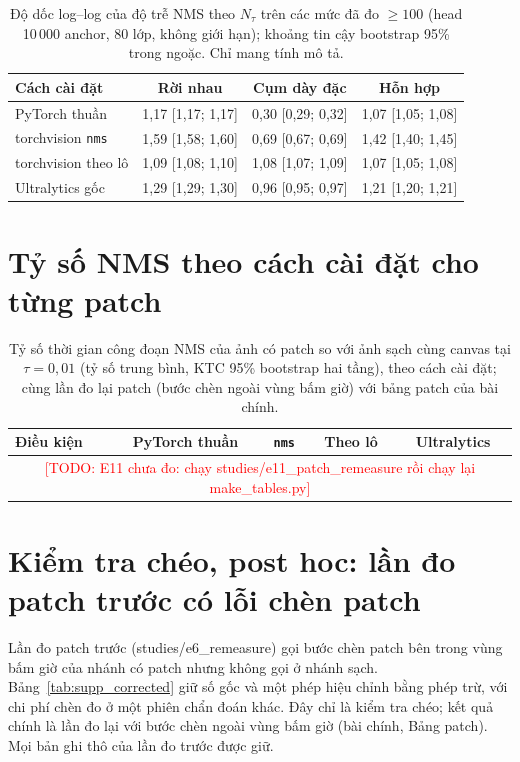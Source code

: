 \documentclass[11pt,a4paper]{article}
\newcommand{\Ntau}{N_{\tau}}
\newcommand{\todo}[1]{\textcolor{red}{[TODO: #1]}}
\begin{document}
\begin{table}[t]
\centering\small
\caption{Độ dốc log--log của độ trễ NMS theo $\Ntau$ trên các mức đã đo $\ge 100$ (head 10\,000 anchor, 80 lớp, không giới hạn); khoảng tin cậy bootstrap 95\% trong ngoặc. Chỉ mang tính mô tả.}
\label{tab:slopes}
\begin{tabular}{@{}lccc@{}}
\toprule
Cách cài đặt & Rời nhau & Cụm dày đặc & Hỗn hợp \\
\midrule
PyTorch thuần & 1,17 [1,17; 1,17] & 0,30 [0,29; 0,32] & 1,07 [1,05; 1,08] \\
torchvision \texttt{nms} & 1,59 [1,58; 1,60] & 0,69 [0,67; 0,69] & 1,42 [1,40; 1,45] \\
torchvision theo lô & 1,09 [1,08; 1,10] & 1,08 [1,07; 1,09] & 1,07 [1,05; 1,08] \\
Ultralytics gốc & 1,29 [1,29; 1,30] & 0,96 [0,95; 0,97] & 1,21 [1,20; 1,21] \\
\bottomrule
\end{tabular}
\end{table}

\section{Tỷ số NMS theo cách cài đặt cho từng patch}
\begin{table}[t]
\centering\small
\caption{Tỷ số thời gian công đoạn NMS của ảnh có patch so với ảnh sạch cùng canvas tại $\tau=0{,}01$ (tỷ số trung bình, KTC 95\% bootstrap hai tầng), theo cách cài đặt; cùng lần đo lại patch (bước chèn ngoài vùng bấm giờ) với bảng patch của bài chính.}
\label{tab:impl}
\begin{tabular}{@{}lcccc@{}}
\toprule
Điều kiện & PyTorch thuần & \texttt{nms} & Theo lô & Ultralytics \\
\midrule
\multicolumn{5}{c}{\todo{E11 chưa đo: chạy studies/e11\_patch\_remeasure rồi chạy lại make\_tables.py}} \\
\bottomrule
\end{tabular}
\end{table}

\section{Kiểm tra chéo, post hoc: lần đo patch trước có lỗi chèn patch}
Lần đo patch trước (studies/e6\_remeasure) gọi bước chèn patch bên trong vùng bấm giờ của nhánh có patch nhưng không gọi ở nhánh sạch. Bảng~\ref{tab:supp_corrected} giữ số gốc và một phép hiệu chỉnh bằng phép trừ, với chi phí chèn đo ở một phiên chẩn đoán khác. Đây chỉ là kiểm tra chéo; kết quả chính là lần đo lại với bước chèn ngoài vùng bấm giờ (bài chính, Bảng patch). Mọi bản ghi thô của lần đo trước được giữ.
\end{document}

